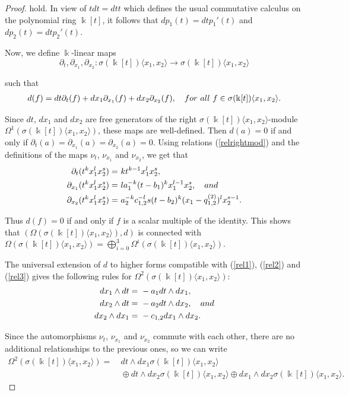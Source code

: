 \documentclass{amsart}
\theoremstyle{definition}
\theoremstyle{remark}
\numberwithin{equation}{section}
\begin{document}
\begin{proof}
hold. In view of $tdt=dtt$ which defines the usual commutative calculus on the polynomial ring $\Bbbk[t]$, it follows that $dp_1(t) = dtp_1'(t)$ and $dp_2(t) = dtp_2'(t)$.

Now, we define $\Bbbk$-linear maps 
$$
\partial_t, \partial_{x_1}, \partial_{x_2}: \sigma(\Bbbk[t])\langle x_1,x_2\rangle \rightarrow \sigma(\Bbbk[t])\langle x_1,x_2\rangle
$$ 

such that
\begin{align*}
d(f) = dt\partial_t(f)+dx_1\partial_{x_1}(f) + dx_2\partial_{x_2}(f), \quad {\rm for\ all}\ f \in \sigma(\Bbbk[t])\langle x_1,x_2\rangle.
\end{align*}

Since $dt$, $dx_1$ and $dx_2$ are free generators of the right $\sigma(\Bbbk[t])\langle x_1,x_2\rangle$-module $\Omega^1(\sigma(\Bbbk[t])\langle x_1,x_2\rangle)$, these maps are well-defined. Then $d(a) = 0$ if and only if $\partial_t(a) = \partial_{x_1}(a) = \partial_{x_2}(a)=0$. Using relations {\rm (}\ref{relrightmod}{\rm )} and the definitions of the maps $\nu_t$, $\nu_{x_1}$ and $\nu_{x_2}$, we get that 
\begin{align*}
    \partial_t(t^kx_1^lx_2^s) = &\ kt^{k-1}x_1^lx_2^s, \\
    \partial_{x_1}(t^kx_1^lx_2^s) = &\ la_1^{-k}(t-b_1)^kx_1^{l-1}x_2^s, \quad {\rm and} \\
    \partial_{x_2}(t^kx_1^lx_2^s) = &\ a_2^{-k}c_{1,2}^{-l}s(t-b_2)^k(x_1-q_{1,2}^{(2)})^lx_2^{s-1}.
\end{align*}

Thus $d(f)=0$ if and only if $f$ is a scalar multiple of the identity. This shows that $(\Omega(\sigma(\Bbbk[t])\langle x_1,x_2\rangle), d)$ is connected with $\Omega(\sigma(\Bbbk[t])\langle x_1,x_2\rangle) = \bigoplus\limits_{i=0}^{3}\Omega^i (\sigma(\Bbbk[t])\langle x_1,x_2\rangle)$.

The universal extension of $d$ to higher forms compatible with {\rm (}\ref{rel1}{\rm )}, {\rm (}\ref{rel2}{\rm )} and {\rm (}\ref{rel3}{\rm )} gives the following rules for $\Omega^2 (\sigma(\Bbbk[t])\langle x_1,x_2\rangle)$:
\begin{align}
    dx_1\wedge dt = &\ -a_1dt\wedge dx_1, \notag \\
    dx_2\wedge dt = &\ -a_2dt\wedge dx_2, \quad {\rm and} \notag \\ 
    dx_2\wedge dx_1 = &\ -c_{1,2}dx_1\wedge dx_2. \label{relsecond}
\end{align}

Since the automorphisms $\nu_{t}$, $\nu_{x_1}$ and $\nu_{x_2}$ commute with each other, there are no additional relationships to the previous ones, so we can write
\begin{align*}
    \Omega^2 (\sigma(\Bbbk[t])\langle x_1,x_2\rangle) = &\ dt\wedge dx_1\sigma(\Bbbk[t])\langle x_1,x_2\rangle\\
    &\ \oplus dt\wedge dx_2\sigma(\Bbbk[t])\langle x_1,x_2\rangle\oplus dx_1\wedge dx_2\sigma(\Bbbk[t])\langle x_1,x_2\rangle.
\end{align*}


\end{proof}
\end{document}
